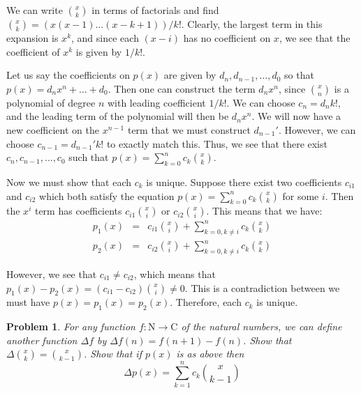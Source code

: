 \documentclass[psamsfonts]{amsart}
\newtheorem{prob}{Problem}[section]
\newenvironment{sol}{{\bfseries Solution}}{\qedsymbol}
\theoremstyle{definition}
\theoremstyle{remark}
\numberwithin{equation}{section}
\begin{document}
\begin{sol}
We can write ${x \choose k}$ in terms of factorials and find ${x \choose k} = (x (x - 1) \ldots (x - k + 1)) / k!$. Clearly, the largest term in this expansion is $x^k$, and since each $(x - i)$ has no coefficient on $x$, we see that the coefficient of $x^k$ is given by $1/k!$. 

Let us say the coefficients on $p(x)$ are given by $d_n, d_{n-1}, \ldots, d_0$ so that $p(x) = d_n x^n + \ldots + d_0$. Then one can construct the term $d_n x^n$, since ${x \choose n}$ is a polynomial of degree $n$ with leading coefficient $1/k!$. We can choose $c_n = d_n k!$, and the leading term of the polynomial will then be $d_n x^n$. We will now have a new coefficient on the $x^{n - 1}$ term that we must construct $d_{n-1}'$. However, we can choose $c_{n-1} = d_{n-1}' k!$ to exactly match this. Thus, we see that there exist $c_{n}, c_{n-1}, \ldots, c_{0}$ such that $p(x) = \sum_{k=0}^n c_k {x \choose k}$. 

Now we must show that each $c_k$ is unique. Suppose there exist two coefficients $c_{i1}$ and $c_{i2}$ which both satisfy the equation $p(x) = \sum_{k=0}^n c_k {x \choose k}$ for some $i$. Then the $x^i$ term has coefficients $c_{i1} {x \choose i}$ or $c_{i2} {x \choose i}$. This means that we have:
\begin{eqnarray}
p_1(x) &=& c_{i1} {x \choose i} + \sum_{k=0, k \neq i}^n c_k {x \choose k } \\
p_2(x)&=& c_{i2} {x \choose i} + \sum_{k=0, k \neq i}^n c_k {x \choose k }
\end{eqnarray}

However, we see that $c_{i1} \neq c_{i2}$, which means that $p_1(x) - p_2(x) = (c_{i1} - c_{i2}) {x \choose i} \neq 0$. This is a contradiction between we must have $p(x) = p_1(x) = p_2(x)$. Therefore, each $c_k$ is unique.
\end{sol}

\begin{prob}
For any function $f: \mathrm{N} \to \mathrm{C}$ of the natural numbers, we can define another function $\Delta f$ by $\Delta f(n) = f(n+1) - f(n)$. Show that $\Delta {x \choose k} = {x \choose {k-1}}$. Show that if $p(x)$ is as above then 
\begin{equation}
\Delta p(x) = \sum_{k=1}^n c_k { x \choose k - 1}
\end{equation}
\end{prob}
\end{document}

